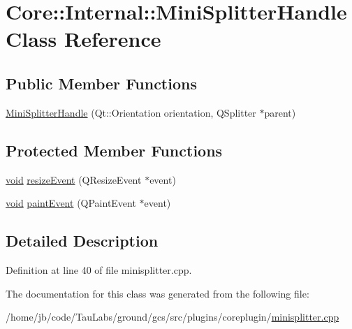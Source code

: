 \hypertarget{class_core_1_1_internal_1_1_mini_splitter_handle}{\section{\-Core\-:\-:\-Internal\-:\-:\-Mini\-Splitter\-Handle \-Class \-Reference}
\label{class_core_1_1_internal_1_1_mini_splitter_handle}
}
\subsection*{\-Public \-Member \-Functions}
\begin{DoxyCompactItemize}
\item 
\hyperlink{group___core_plugin_ga65f8058210c0d720960768f24228fed2}{\-Mini\-Splitter\-Handle} (\-Qt\-::\-Orientation orientation, \-Q\-Splitter $\ast$parent)
\end{DoxyCompactItemize}
\subsection*{\-Protected \-Member \-Functions}
\begin{DoxyCompactItemize}
\item 
\hyperlink{group___u_a_v_objects_plugin_ga444cf2ff3f0ecbe028adce838d373f5c}{void} \hyperlink{group___core_plugin_ga7ce2e2f7fcc5dcbe3911272c1075c895}{resize\-Event} (\-Q\-Resize\-Event $\ast$event)
\item 
\hyperlink{group___u_a_v_objects_plugin_ga444cf2ff3f0ecbe028adce838d373f5c}{void} \hyperlink{group___core_plugin_ga2e0a77b1add27985302bd6aedf2179a5}{paint\-Event} (\-Q\-Paint\-Event $\ast$event)
\end{DoxyCompactItemize}


\subsection{\-Detailed \-Description}


\-Definition at line 40 of file minisplitter.\-cpp.



\-The documentation for this class was generated from the following file\-:\begin{DoxyCompactItemize}
\item 
/home/jb/code/\-Tau\-Labs/ground/gcs/src/plugins/coreplugin/\hyperlink{minisplitter_8cpp}{minisplitter.\-cpp}\end{DoxyCompactItemize}
